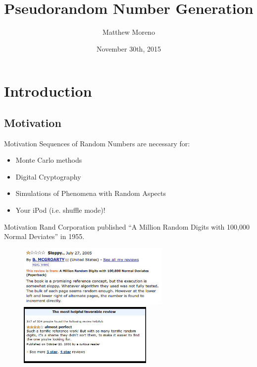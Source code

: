 \documentclass{beamer}
\title[PRNGs]{Pseudorandom Number Generation}
\author{Matthew Moreno}
\institute{University of Puget Sound}
\date{November 30th, 2015}
\begin{document}
\begin{frame}
  \titlepage
\end{frame}


\section{Introduction}
\subsection{Motivation}
\begin{frame}{Motivation}
Sequences of Random Numbers are necessary for:
\begin{itemize}
  \pause \item Monte Carlo methods
  \pause \item Digital Cryptography
  \pause \item Simulations of Phenomena with Random Aspects
  \pause \item Your iPod (i.e. shuffle mode)!
\end{itemize}

\end{frame}

\begin{frame}{Motivation}
Rand Corporation published ``A Million Random Digits with 100,000 Normal Deviates'' in 1955.
\begin{figure}
\includegraphics[height=3cm]{million_random_digits_review_1.jpg} \\
\includegraphics[height=3cm]{million_random_digits_review_2.jpg}
\end{figure}
\end{frame}
\end{document}
